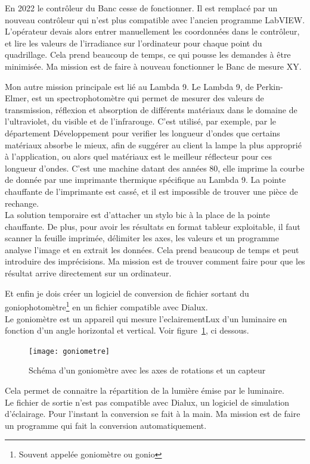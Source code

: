 \documentclass[12pt]{article}
\begin{document}
En 2022 le contrôleur du Banc cesse de fonctionner.
Il est remplacé par un nouveau contrôleur qui n'est plus compatible avec l'ancien programme LabVIEW.\\
L'opérateur devais alors entrer manuellement les coordonnées dans le contrôleur, et lire les valeurs de l'irradiance sur l'ordinateur pour chaque point du quadrillage.
Cela prend beaucoup de temps, ce qui pousse les demandes à être minimisée.
Ma mission est de faire à nouveau fonctionner le Banc de mesure XY.


Mon autre mission principale est lié au Lambda 9.
Le Lambda 9, de Perkin-Elmer, est un spectrophotomètre qui permet de mesurer des valeurs de transmission, réflexion et absorption de différents matériaux dans le domaine de l'ultraviolet, du visible et de l'infrarouge.
C'est utilisé, par exemple, par le département Développement pour verifier les longueur d'ondes que certains matériaux absorbe le mieux, afin de suggérer au client la lampe la plus approprié à l'application, ou alors quel matériaux est le meilleur réflecteur pour ces longueur d'ondes.
C'est une machine datant des années 80, elle imprime la courbe de donnée par une imprimante thermique spécifique au Lambda 9.
La pointe chauffante de l'imprimante est cassé, et il est impossible de trouver une pièce de rechange.\\
La solution temporaire est d'attacher un stylo bic à la place de la pointe chauffante.
De plus, pour avoir les résultats en format tableur exploitable, il faut scanner la feuille imprimée, délimiter les axes, les valeurs et un programme analyse l'image et en extrait les données.
Cela prend beaucoup de temps et peut introduire des imprécisions.
Ma mission est de trouver comment faire pour que les résultat arrive directement sur un ordinateur.



Et enfin je dois créer un logiciel de conversion de fichier sortant du goniophotomètre\footnote{Souvent appelée goniomètre ou gonio} en un fichier compatible avec Dialux.\\
Le goniomètre est un appareil qui mesure l'\gls{eclairementLux} d'un luminaire en fonction d'un angle horizontal et vertical.
Voir figure~\ref{fig:gonio}, ci dessous.
\begin{figure}[h]
	\centering
	\texttt{[image: goniometre]}
	\caption{Schéma d'un goniomètre avec les axes de rotations et un capteur}
	\label{fig:gonio}
\end{figure}
Cela permet de connaitre la répartition de la lumière émise par le luminaire.\\
Le fichier de sortie n'est pas compatible avec Dialux, un logiciel de simulation d'éclairage.
Pour l'instant la conversion se fait à la main. 
Ma mission est de faire un programme qui fait la conversion automatiquement.
\end{document}
